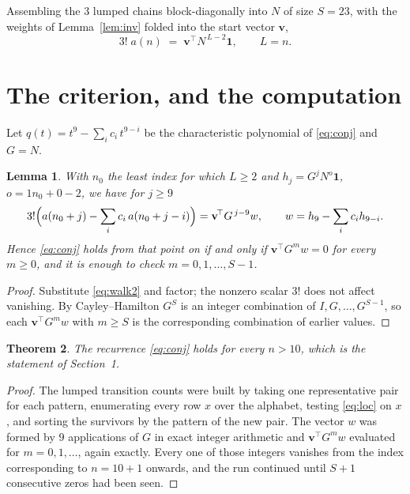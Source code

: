 \documentclass[11pt,a4paper]{article}
\theoremstyle{plain}
\newtheorem{theorem}{Theorem}
\newtheorem{lemma}[theorem]{Lemma}
\theoremstyle{definition}
\begin{document}
Assembling the $3$ lumped chains block-diagonally into $N$ of size $S=23$, with the
weights of Lemma~\ref{lem:inv} folded into the start vector $\mathbf{v}$,
\begin{equation}\label{eq:walk2}
3!\;a(n)\;=\;\mathbf{v}^{\!\top}N^{\,L-2}\mathbf{1},\qquad L=n .
\end{equation}

\section{The criterion, and the computation}

Let $q(t)=t^{9}-\sum_i c_i\,t^{9-i}$ be the characteristic polynomial of
\eqref{eq:conj} and $G=N$.

\begin{lemma}\label{lem:crit}
With $n_0$ the least index for which $L\ge2$ and $h_j=G^{j}N^{o}\mathbf{1}$,
$o=1n_0+0-2$, we have for $j\ge9$
\[
3!\Bigl(a(n_0+j)-\sum_i c_i\,a(n_0+j-i)\Bigr)
=\mathbf{v}^{\!\top}G^{\,j-9}w,\qquad
w=h_{9}-\sum_i c_i h_{9-i} .
\]
Hence \eqref{eq:conj} holds from that point on if and only if
$\mathbf{v}^{\!\top}G^{m}w=0$ for every $m\ge0$, and it is enough to check
$m=0,1,\dots,S-1$.
\end{lemma}

\begin{proof}
Substitute \eqref{eq:walk2} and factor; the nonzero scalar $3!$ does not affect
vanishing. By Cayley--Hamilton $G^{S}$ is an integer combination of $I,G,\dots,G^{S-1}$,
so each $\mathbf{v}^{\!\top}G^{m}w$ with $m\ge S$ is the corresponding combination of
earlier values.
\end{proof}

\begin{theorem}
The recurrence \eqref{eq:conj} holds for every $n>10$, which is the statement of
Section~1.
\end{theorem}

\begin{proof}
The lumped transition counts were built by taking one representative pair for each pattern,
enumerating every row $x$ over the alphabet, testing \eqref{eq:loc} on $x$, and sorting
the survivors by the pattern of the new pair. The vector $w$ was formed by $9$
applications of $G$ in exact integer arithmetic and $\mathbf{v}^{\!\top}G^{m}w$
evaluated for $m=0,1,\dots$, again exactly. Every one of those integers vanishes from the
index corresponding to $n=10+1$ onwards, and the run continued until $S+1$ consecutive
zeros had been seen.
\end{proof}
\end{document}
